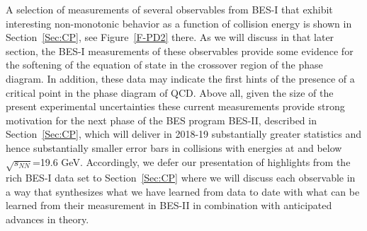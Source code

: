 A selection of measurements of several observables from BES-I that exhibit interesting 
non-monotonic behavior as a function of collision energy is shown in 
Section~\ref{Sec:CP}, see Figure~\ref{F-PD2} there.  
As we will discuss in that later section, the BES-I measurements of these 
observables provide some
evidence for the softening of the equation of state in the 
crossover region of the phase diagram. 
In addition, these data may indicate
the first hints of the presence of a critical point in the phase
diagram of QCD. Above all, given the size of the present
experimental uncertainties these current measurements 
provide strong motivation
for the next phase of the BES program BES-II, described in Section~\ref{Sec:CP}, which will deliver in 2018-19
substantially greater statistics and hence substantially smaller error bars
in collisions with energies at and below $\sqrt{s_{NN}}$=19.6 GeV.
Accordingly, we defer our presentation of  highlights from the rich BES-I data set to 
Section~\ref{Sec:CP}
where we will discuss each observable in a way that synthesizes
what we have learned from data to date with what can be learned
from their measurement in BES-II in combination with anticipated advances
in theory.



